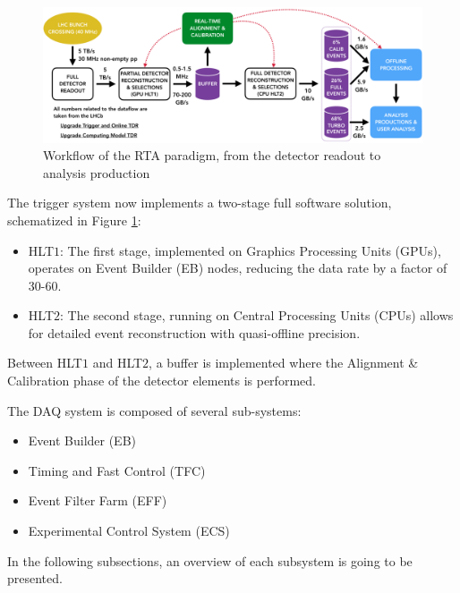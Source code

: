 \begin{figure}
    \centering
    \includegraphics[width=\textwidth]{figures/hidef_RTA_dataflow_widescreen.png}
    \caption{Workflow of the RTA paradigm, from the detector readout to analysis production}
    \label{fig:RTA}
\end{figure}

The trigger system now implements a two-stage full software solution, schematized in Figure \ref{fig:RTA}:
\begin{itemize}
\item HLT$1$: The first stage, implemented on Graphics Processing Units (GPUs), operates on Event Builder (EB) nodes, reducing the data rate by a factor of 30-60.
\item HLT$2$: The second stage, running on Central Processing Units (CPUs) allows for detailed event reconstruction with quasi-offline precision\cite{Gazzoni:2670650}.
\end{itemize}
Between HLT$1$ and HLT$2$, a buffer is implemented where the Alignment \& Calibration phase of the detector elements is performed.

The DAQ system\cite{CERN-LHCC-2014-016} is composed of several sub-systems:
\begin{itemize}
\item Event Builder (EB)
\item Timing and Fast Control (TFC)
\item Event Filter Farm (EFF)
\item Experimental Control System (ECS)
\end{itemize}
In the following subsections, an overview of each subsystem is going to be presented. 

